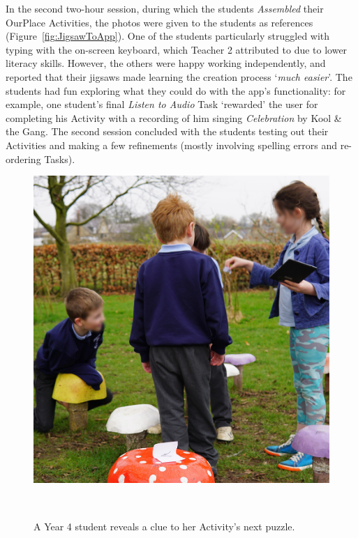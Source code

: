 \documentclass[,hyphens]{sigchi}
\begin{document}
In the second two-hour session, during which the students \textit{Assembled} their OurPlace Activities, the photos were given to the students as references   (Figure~\ref{fig:JigsawToApp}). One of the students particularly struggled with typing with the on-screen keyboard, which Teacher 2 attributed to due to lower literacy skills. However, the others were happy working independently, and reported that their jigsaws made learning the creation process `\textit{much easier}'. The students had fun exploring what they could do with the app's functionality: for example, one student's final \textit{Listen to Audio} Task `rewarded' the user for completing his Activity with a recording of him singing \textit{Celebration} by Kool \& the Gang. The second session concluded with the students testing out their Activities and making a few refinements (mostly involving spelling errors and re-ordering Tasks). 

\begin{figure}
\centering
  \includegraphics[width=0.8\columnwidth]{figures/mushrooms}
  \caption{A Year 4 student reveals a clue to her Activity's next puzzle. }~\label{fig:Mushrooms}
\end{figure}
\end{document}
